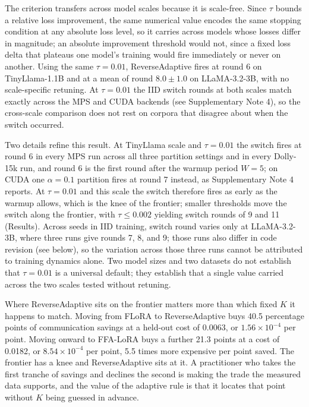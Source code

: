 \documentclass[pdflatex,sn-nature,lineno]{sn-jnl}
\begin{document}
The criterion transfers across model scales because it is scale-free. Since $\tau$ bounds a relative loss improvement, the same numerical value encodes the same stopping condition at any absolute loss level, so it carries across models whose losses differ in magnitude; an absolute improvement threshold would not, since a fixed loss delta that plateaus one model's training would fire immediately or never on another. Using the same $\tau{=}0.01$, ReverseAdaptive fires at round 6 on TinyLlama-1.1B and at a mean of round $8.0 \pm 1.0$ on LLaMA-3.2-3B, with no scale-specific retuning. At $\tau{=}0.01$ the IID switch rounds at both scales match exactly across the MPS and CUDA backends (see Supplementary Note 4), so the cross-scale comparison does not rest on corpora that disagree about when the switch occurred.

Two details refine this result. At TinyLlama scale and $\tau{=}0.01$ the switch fires at round 6 in every MPS run across all three partition settings and in every Dolly-15k run, and round 6 is the first round after the warmup period $W{=}5$; on CUDA one $\alpha{=}0.1$ partition fires at round 7 instead, as Supplementary Note 4 reports. At $\tau{=}0.01$ and this scale the switch therefore fires as early as the warmup allows, which is the knee of the frontier; smaller thresholds move the switch along the frontier, with $\tau \leq 0.002$ yielding switch rounds of 9 and 11 (Results). Across seeds in IID training, switch round varies only at LLaMA-3.2-3B, where three runs give rounds 7, 8, and 9; those runs also differ in code revision (see below), so the variation across those three runs cannot be attributed to training dynamics alone. Two model sizes and two datasets do not establish that $\tau{=}0.01$ is a universal default; they establish that a single value carried across the two scales tested without retuning.

Where ReverseAdaptive sits on the frontier matters more than which fixed $K$ it happens to match. Moving from FLoRA to ReverseAdaptive buys 40.5 percentage points of communication savings at a held-out cost of 0.0063, or $1.56 \times 10^{-4}$ per point. Moving onward to FFA-LoRA buys a further 21.3 points at a cost of 0.0182, or $8.54 \times 10^{-4}$ per point, 5.5 times more expensive per point saved. The frontier has a knee and ReverseAdaptive sits at it. A practitioner who takes the first tranche of savings and declines the second is making the trade the measured data supports, and the value of the adaptive rule is that it locates that point without $K$ being guessed in advance.
\end{document}

